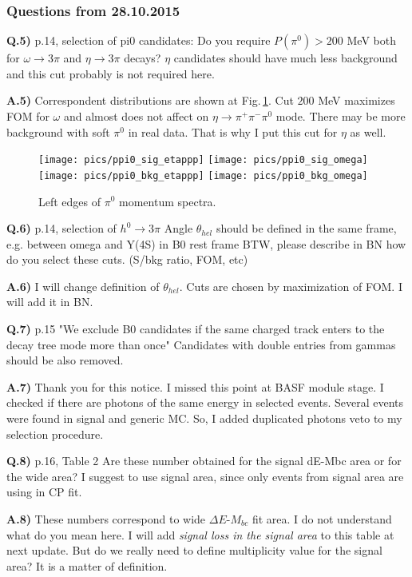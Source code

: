 \documentclass[a4paper,12pt]{article}
\begin{document}
\subsubsection*{Questions from 28.10.2015}
{\bf Q.5)} p.14, selection of pi0 candidates:
Do you require $P(\pi^0)> 200$ MeV both for $\omega\to 3\pi$ and $\eta\to 3\pi$ decays? $\eta$ candidates should have much less background and this cut probably is not required here.

{\bf A.5)} Correspondent distributions are shown at Fig.\,\ref{fig:ppi0}. Cut $200$ MeV maximizes FOM for $\omega$ and almost does not affect on $\eta\to\pi^+\pi^-\pi^0$ mode. There may be more background with soft $\pi^0$ in real data. That is why I put this cut for $\eta$ as well.
\begin{figure}[htb]
\texttt{[image: pics/ppi0\_sig\_etappp]}
\texttt{[image: pics/ppi0\_sig\_omega]}\\
\texttt{[image: pics/ppi0\_bkg\_etappp]}
\texttt{[image: pics/ppi0\_bkg\_omega]}
\caption{Left edges of $\pi^0$ momentum spectra.}
\label{fig:ppi0}
\end{figure}

{\bf Q.6)} p.14, selection of $h^0\to 3\pi$
Angle $\theta_{hel}$ should be defined in the same frame, e.g. between omega and Y(4S) in B0 rest frame
BTW, please describe in BN how do you select these cuts. (S/bkg ratio, FOM, etc)

{\bf A.6)} I will change definition of $\theta_{hel}$. Cuts are chosen by maximization of FOM. I will add it in BN.

{\bf Q.7)} p.15 "We exclude B0 candidates if the same charged track enters to the decay tree mode more than once"
Candidates with double entries from gammas should be also removed.

{\bf A.7)} Thank you for this notice. I missed this point at BASF module stage. I checked if there are photons of the same energy in selected events. Several events were found in signal and generic MC. So, I added duplicated photons veto to my selection procedure.

{\bf Q.8)} p.16, Table 2
Are these number obtained for the signal dE-Mbc area or for the wide area? I suggest to use signal area, since only events from signal area are using in CP fit.

{\bf A.8)} These numbers correspond to wide $\Delta E$-$M_{bc}$ fit area. I do not understand what do you mean here. I will add {\it signal loss in the signal area} to this table at next update. But do we really need to define multiplicity value for the signal area? It is a matter of definition.
\end{document}
